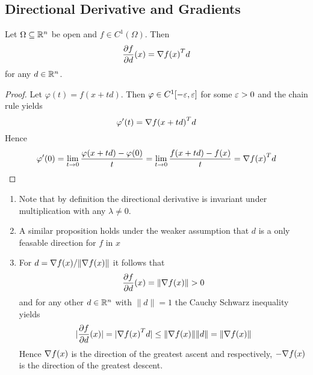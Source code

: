 \subsection{Directional Derivative and Gradients}


\begin{lemma}\label{lemma:directional_derivative}
    Let \( \Omega \subseteq \mathbb{R}^n \) be open and \( f \in C^1(\Omega) \). Then
    \[
        \frac{\partial f}{\partial d}(x) = \nabla{f(x)}^T d
    \]
    for any \( d \in \mathbb{R}^n \).
\end{lemma}

\begin{proof}
    Let \( \varphi(t) = f(x + td) \). Then \( \varphi \in C^1[-\varepsilon, \varepsilon ] \) for some \( \varepsilon > 0 \)
    and the chain rule yields
    \[
        \varphi'(t) = {\nabla f(x + td)}^T d
    \]
    Hence
    \[
        \varphi'(0) = \lim_{t \to 0} \frac{\varphi(x + td) - \varphi(0)}{t} =
        \lim_{t \to 0} \frac{f(x + td) - f(x)}{t} = {\nabla f(x)}^T d
    \]
\end{proof}
\bigskip

\begin{remarks}\hfill
    \begin{enumerate}
        \item Note that by definition the directional derivative is invariant under multiplication
              with any \( \lambda \ne 0 \).

        \item A similar proposition holds under the weaker assumption that \( d \) is a only feasable direction
              for \( f \) in \( x \)

        \item For \( d = \nabla{f(x)}/\| \nabla{f(x)}\| \) it follows that
              \[
                  \frac{\partial f}{\partial d}(x) = \|\nabla{f(x)}\| > 0
              \]
              and for any other \( d \in \mathbb{R}^n \) with \( \|d\| = 1 \) the Cauchy Schwarz inequality yields
              \[
                  |\frac{\partial f}{\partial d}(x)| = |\nabla{f(x)}^T d| \le \|\nabla{f(x)}\| \|d\| =
                  \|\nabla{f(x)}\|
              \]
              Hence \( \nabla{f(x)} \) is the direction of the greatest ascent and respectively,
              \( -\nabla{f(x)} \) is the direction of the greatest descent.
    \end{enumerate}
\end{remarks}
\bigskip


